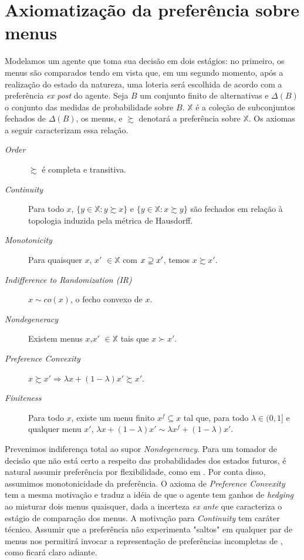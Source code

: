\documentclass[11pt, a4paper]{article}
\theoremstyle{nonumberplain}
\theoremstyle{plain}
\theoremstyle{plain}
\theoremstyle{plain}
\theoremstyle{nonumberplain}
\begin{document}
\section{Axiomatização da preferência sobre menus}
Modelamos um agente que toma sua decisão em dois estágios: no primeiro, os menus são comparados tendo em vista que, em um segundo momento, após a realização do estado da natureza, uma loteria será escolhida de acordo com a preferência \emph{ex post} do agente.
Seja $B$ um conjunto finito de alternativas e $\Delta(B)$ o conjunto das medidas de probabilidade sobre $B$. $\mathbb{X}$ é a coleção de subconjuntos fechados de $\Delta(B)$, os menus, e $\succsim$ denotará a preferência sobre $\mathbb{X}$. Os axiomas a seguir caracterizam essa relação.
\begin{description}
\item [\textit{Order}] $\succsim$ é completa e transitiva.
\item [\textit{Continuity}] Para todo $x$, $\{y\in \mathbb{X}:y\succsim x\}$ e $\{y\in \mathbb{X}:x\succsim y\}$ são fechados em relação à topologia induzida pela métrica de Hausdorff.%
\item [\textit{Monotonicity}] Para quaisquer $x$, $x'$ $\in\mathbb{X}$ com $x\begin{small}\supseteq\end{small} x'$, temos $x\succsim x'$.
\item [\textit{Indifference to Randomization (IR)}] $x\sim co(x)$, o fecho convexo de $x$.
\item [\textit{Nondegeneracy}] Existem menus $x$,$x'$ $\in \mathbb{X}$ tais que $x\succ x'$.
\item [\textit{Preference Convexity}] $x\succsim x' \Rightarrow \lambda x +(1-\lambda)x'\succsim x'$.
\item[\textit{Finiteness}] Para todo $x$, existe um menu finito $x^f\subseteq x$ tal que, para todo $\lambda\in (0,1]$ e qualquer menu $x'$, $\lambda x +(1-\lambda)x' \sim \lambda x^f +(1-\lambda)x'$.
\end{description}
Prevenimos indiferença total ao supor \emph{Nondegeneracy}. Para um tomador de decisão que não está certo a respeito das probabilidades dos estados futuros, é natural assumir preferência por flexibilidade, como em \cite{Kreps1979}. Por conta disso, assumimos monotonicidade da preferência. O axioma de \emph{Preference Convexity} tem a mesma motivação e traduz a idéia de que o agente tem ganhos de \emph{hedging} ao misturar dois menus quaisquer, dada a incerteza \emph{ex ante} que caracteriza o estágio de comparação dos menus. A motivação para \emph{Continuity} tem caráter técnico. Assumir que a preferência não experimenta "saltos" em qualquer par de menus nos permitirá invocar a representação de preferências incompletas de \cite{Kochov2007}, como ficará claro adiante.
\end{document}
